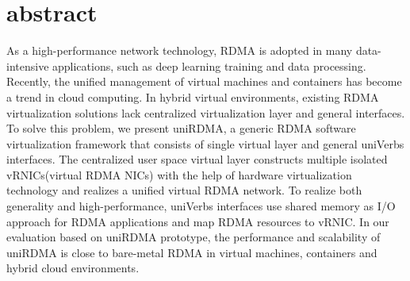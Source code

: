 \documentclass[sigplan,screen]{acmart}
\begin{document}
\section{abstract}
As a high-performance network technology, RDMA is adopted in many data-intensive applications, such as deep learning training and data processing. Recently, the unified management of virtual machines and containers has become a trend in cloud computing. In hybrid virtual environments, existing RDMA virtualization solutions lack centralized virtualization layer and general interfaces. To solve this problem, we present uniRDMA, a generic RDMA software virtualization framework that consists of single virtual layer and general uniVerbs interfaces. The centralized user space virtual layer constructs multiple isolated vRNICs(virtual RDMA NICs) with the help of hardware virtualization technology and realizes a unified virtual RDMA network. To realize both generality and high-performance, uniVerbs interfaces use shared memory as I/O approach for RDMA applications and map RDMA resources to vRNIC. In our evaluation based on uniRDMA prototype, the performance and scalability of uniRDMA is close to bare-metal RDMA in virtual machines, containers and hybrid cloud environments.
\end{document}
